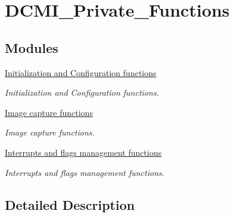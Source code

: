 \hypertarget{group___d_c_m_i___private___functions}{}\section{D\+C\+M\+I\+\_\+\+Private\+\_\+\+Functions}
\label{group___d_c_m_i___private___functions}
\subsection*{Modules}
\begin{DoxyCompactItemize}
\item 
\hyperlink{group___d_c_m_i___group1}{Initialization and Configuration functions}
\begin{DoxyCompactList}\small\item\em Initialization and Configuration functions. \end{DoxyCompactList}\item 
\hyperlink{group___d_c_m_i___group2}{Image capture functions}
\begin{DoxyCompactList}\small\item\em Image capture functions. \end{DoxyCompactList}\item 
\hyperlink{group___d_c_m_i___group3}{Interrupts and flags management functions}
\begin{DoxyCompactList}\small\item\em Interrupts and flags management functions. \end{DoxyCompactList}\end{DoxyCompactItemize}


\subsection{Detailed Description}
